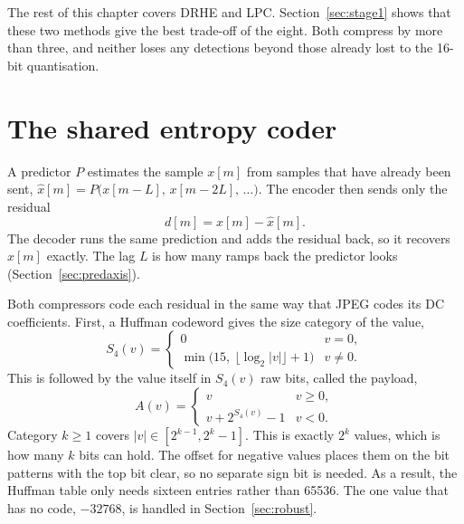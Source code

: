 The rest of this chapter covers DRHE and LPC. Section~\ref{sec:stage1} shows
that these two methods give the best trade-off of the eight. Both compress by
more than three, and neither loses any detections beyond those already lost to
the 16-bit quantisation.

\section{The shared entropy coder}
\label{sec:entropycoder}
\label{sec:whatresidual}

A predictor $P$ estimates the sample $x[m]$ from samples that have already been
sent, $\hat{x}[m] = P\bigl(x[m-L],\, x[m-2L],\, \ldots\bigr)$. The encoder then
sends only the residual
\begin{equation}
\label{eq:residualdef}
d[m] = x[m] - \hat{x}[m].
\end{equation}
The decoder runs the same prediction and adds the residual back, so it recovers
$x[m]$ exactly. The lag $L$ is how many ramps back the predictor looks
(Section~\ref{sec:predaxis}).

Both compressors code each residual in the same way that JPEG codes its DC
coefficients. First, a Huffman codeword gives the size category of the value,
\begin{equation}
\label{eq:s4}
S_4(v) =
\begin{cases}
0 & v = 0,\\[2pt]
\min\bigl(15,\ \lfloor \log_2 |v| \rfloor + 1\bigr) & v \neq 0.
\end{cases}
\end{equation}
This is followed by the value itself in $S_4(v)$ raw bits, called the payload,
\begin{equation}
\label{eq:append}
A(v) =
\begin{cases}
v & v \geq 0,\\
v + 2^{S_4(v)} - 1 & v < 0.
\end{cases}
\end{equation}
Category $k \geq 1$ covers $|v| \in [2^{k-1}, 2^k - 1]$. This is exactly
$2^k$ values, which is how many $k$ bits can hold. The offset for negative
values places them on the bit patterns with the top bit clear, so no separate
sign bit is needed. As a result, the Huffman table only needs sixteen entries
rather than \num{65536}. The one value that has no code, $-32768$, is handled
in Section~\ref{sec:robust}.

